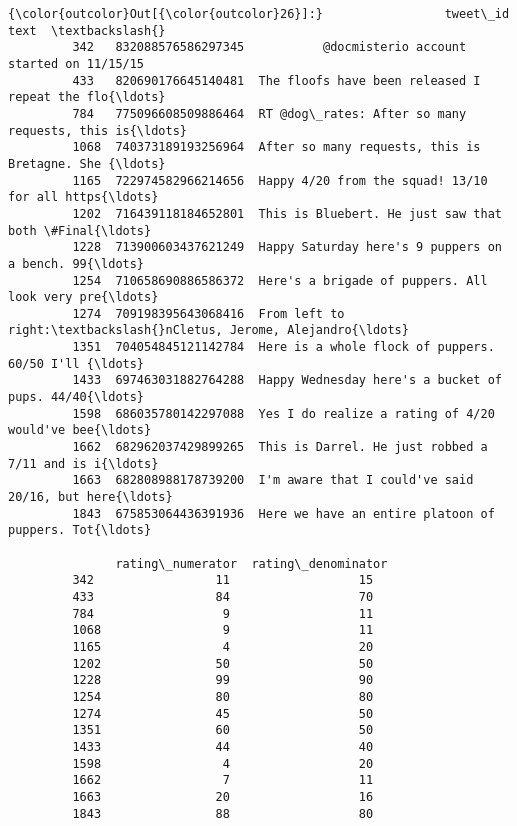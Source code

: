 \documentclass[11pt]{article}
\begin{document}
\begin{Verbatim}[commandchars=\\\{\}]
{\color{outcolor}Out[{\color{outcolor}26}]:}                 tweet\_id                                               text  \textbackslash{}
         342   832088576586297345           @docmisterio account started on 11/15/15   
         433   820690176645140481  The floofs have been released I repeat the flo{\ldots}   
         784   775096608509886464  RT @dog\_rates: After so many requests, this is{\ldots}   
         1068  740373189193256964  After so many requests, this is Bretagne. She {\ldots}   
         1165  722974582966214656  Happy 4/20 from the squad! 13/10 for all https{\ldots}   
         1202  716439118184652801  This is Bluebert. He just saw that both \#Final{\ldots}   
         1228  713900603437621249  Happy Saturday here's 9 puppers on a bench. 99{\ldots}   
         1254  710658690886586372  Here's a brigade of puppers. All look very pre{\ldots}   
         1274  709198395643068416  From left to right:\textbackslash{}nCletus, Jerome, Alejandro{\ldots}   
         1351  704054845121142784  Here is a whole flock of puppers.  60/50 I'll {\ldots}   
         1433  697463031882764288  Happy Wednesday here's a bucket of pups. 44/40{\ldots}   
         1598  686035780142297088  Yes I do realize a rating of 4/20 would've bee{\ldots}   
         1662  682962037429899265  This is Darrel. He just robbed a 7/11 and is i{\ldots}   
         1663  682808988178739200  I'm aware that I could've said 20/16, but here{\ldots}   
         1843  675853064436391936  Here we have an entire platoon of puppers. Tot{\ldots}   
         
               rating\_numerator  rating\_denominator  
         342                 11                  15  
         433                 84                  70  
         784                  9                  11  
         1068                 9                  11  
         1165                 4                  20  
         1202                50                  50  
         1228                99                  90  
         1254                80                  80  
         1274                45                  50  
         1351                60                  50  
         1433                44                  40  
         1598                 4                  20  
         1662                 7                  11  
         1663                20                  16  
         1843                88                  80  
\end{Verbatim}
            
\end{document}
